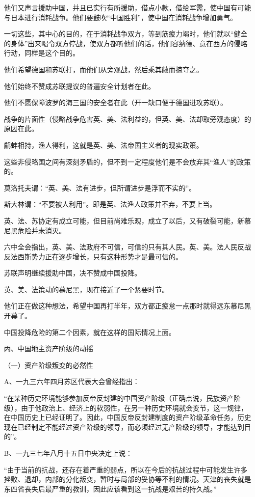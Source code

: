 他们又声言援助中国，并且已实行有所援助，借点小款，借给军需，使中国有可能与日本进行消耗战争。他们要鼓吹“中国胜利”，使中国在消耗战争增加勇气。

一切这些，其中心的目的，在于消耗战争双方，等到筋疲力竭时，他们就以“健全的身体”出来喝令双方停战，使双方都听他们的话，他们容纳德、意在西方的侵略行动，同样是这个目的。

他们希望德国和苏联打，而他们从旁观战，然后乘其敝而掠夺之。

他们始终不赞成苏联提议的普遍安全计划者在此。

他们不愿保障波罗的海三国的安全者在此（开一缺口便于德国进攻苏联）。

战争的片面性（侵略战争危害英、美、法利益的，但英、美、法却取旁观态度）的原因在此。

鹬蚌相持，渔人得利，这就是英、美、法帝国主义者的现实政策。

这些非侵略国之间有深刻矛盾的，但不到一定程度他们是不会放弃其“渔人”的政策的。

莫洛托夫谓：“英、美、法有进步，但所谓进步是浮而不实的”。

斯大林谓：“不要被人利用”。即是英、法渔人政策并不弃，不要上当。

英、法、苏协定有成立可能，但目前尚难乐观，成立了以后，又有破裂可能，新慕尼黑危险并未消灭。

六中全会指出，英、美、法政府不可信，可信的只有其人民。英、美。法人民反战反法西斯势力正在逐步增长，只有这种形势才是最可信的。

苏联声明继续援助中国，决不赞成中国投降。

英、美、法策动的慕尼黑，现在接近了一个紧要时节。

他们正在做这种想法，希望中国再打半年，双方都正疲怠一点那时就得远东慕尼黑开幕了。

中国投降危险的第二个因素，就在这样的国际情况上面。

丙、中国地主资产阶级的动摇

（一）资产阶级叛变的必然性

A、一九三六年四月苏区代表大会曾经指出：

“在某种历史环境能够参加反帝反封建的中国资产阶级（正确点说，民族资产阶级），由于他政治上、经济上的软弱性，在另一种历史环境就会变节，这一规律，在中国历史上已经证明了。因此，中国反帝反封建制度的资产阶级革命任务，历史现在已经制定不能经过资产阶级的领导，而必须经过无产阶级的领导，才能达到目的”。

B、一九三七年八月十五日中央决定上说：

“由于当前的抗战，还存在着严重的弱点，所以在今后的抗战过程中可能发生许多挫败、退却，内部的分化叛变，暂时与局部的妥协等不利的情况。天津的丧失就是东四省丧失后最严重的教训，因此应该看到这一抗战是艰苦的持久战。”

